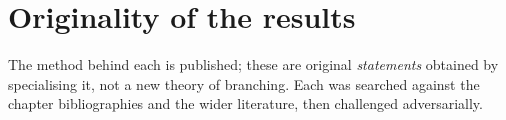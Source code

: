 \chapter*{Originality of the results}
\label{oi:details}
\begingroup
\setlength{\tabcolsep}{4.5pt}
\renewcommand{\arraystretch}{1.1}

\label{oi:statements}

{\noindent
The method behind each is published; these are original \emph{statements} obtained by
specialising it, not a new theory of branching. Each was searched against the chapter
bibliographies and the wider literature, then challenged adversarially.\par}

